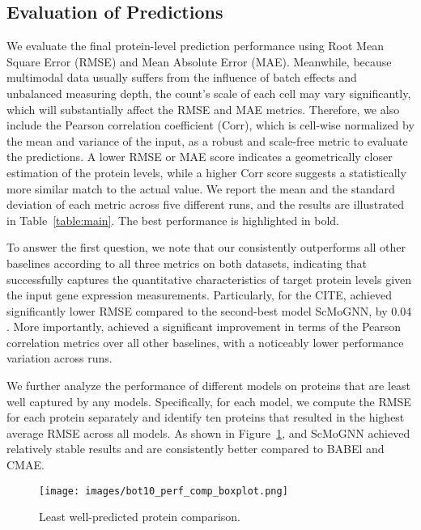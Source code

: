 \subsection{Evaluation of Predictions}

We evaluate the final protein-level prediction performance using Root Mean Square Error (RMSE) and Mean Absolute Error (MAE). Meanwhile, because multimodal data usually suffers from the influence of batch effects and unbalanced measuring depth, the count's scale of each cell may vary significantly, which will substantially affect the RMSE and MAE metrics. Therefore, we also include the Pearson correlation coefficient (Corr), which is cell-wise normalized by the mean and variance of the input, as a robust and scale-free metric to evaluate the predictions. A lower RMSE or MAE score indicates a geometrically closer estimation of the protein levels, while a higher Corr score suggests a statistically more similar match to the actual value. We report the mean and the standard deviation of each metric across five different runs, and the results are illustrated in Table~\ref{table:main}. The best performance is highlighted in bold. 

To answer the first question, we note that our \method{} consistently outperforms all other baselines according to all three metrics on both datasets, indicating that \method{} successfully captures the quantitative characteristics of target protein levels given the input gene expression measurements. Particularly, for the CITE, \method{} achieved significantly lower RMSE compared to the second-best model ScMoGNN, by $0.04$. More importantly, \method{} achieved a significant improvement in terms of the Pearson correlation metrics over all other baselines, with a noticeably lower performance variation across runs.

We further analyze the performance of different models on proteins that are least well captured by any models. Specifically, for each model, we compute the RMSE for each protein separately and identify ten proteins that resulted in the highest average RMSE across all models. As shown in Figure~\ref{fig:bot10comp}, \method{} and ScMoGNN achieved relatively stable results and are consistently better compared to BABEl and CMAE.

\begin{figure}[htb]
    \centering
    \vspace{-1.2em}
    \caption{Least well-predicted protein comparison.}
    \texttt{[image: images/bot10\_perf\_comp\_boxplot.png]}
    \vspace{-1.2em}
    \label{fig:bot10comp}
\end{figure}


